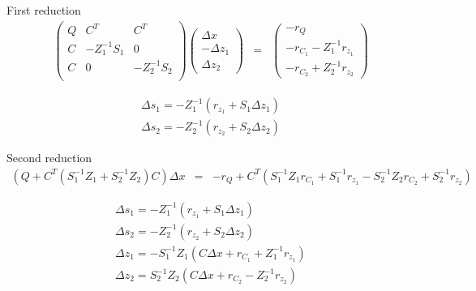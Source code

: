 \documentclass[a4paper]{paper}
\begin{document}
First reduction
\begin{eqnarray*}
\left(\begin{array}{ccc}
Q & C^T & C^T \\
C & -Z_1^{-1} S_1  & 0   \\
C & 0   & -Z_2^{-1}S_2 \\
\end{array}\right)
\left(\begin{array}{c}
\Delta x\\
-\Delta z_1\\
\Delta z_2
\end{array}\right)
&=&
\left(\begin{array}{c}
-r_Q\\
-r_{C_1} - Z_1^{-1} r_{z_1}\\
-r_{C_2} + Z_2^{-1} r_{z_2}
\end{array}\right)
\end{eqnarray*}

\[
\begin{array}{c}
\Delta s_1 = -Z_1^{-1} (r_{z_1} + S_1 \Delta z_1)\\
\Delta s_2 = -Z_2^{-1} (r_{z_2} + S_2 \Delta z_2)
\end{array}
\]

Second reduction
\begin{eqnarray*}
(Q + C^T (S_1^{-1} Z_1 + S_2^{-1} Z_2)C) \Delta x
&=&
-r_Q + C^T (S_1^{-1}  Z_1 r_{C_1} + S_1^{-1} r_{z_1} - S_2^{-1} Z_2 r_{C_2} + S_2^{-1} r_{z_2})
\end{eqnarray*}

\[
\begin{array}{c}
\Delta s_1 = -Z_1^{-1} (r_{z_1} + S_1 \Delta z_1)\\
\Delta s_2 = -Z_2^{-1} (r_{z_2} + S_2 \Delta z_2)\\
\Delta z_1 = -S_1^{-1} Z_1 ( C \Delta x + r_{C_1} + Z_1^{-1} r_{z_1} )\\
\Delta z_2 = S_2^{-1} Z_2 ( C \Delta x + r_{C_2} - Z_2^{-1} r_{z_2})
\end{array}
\]
\end{document}
